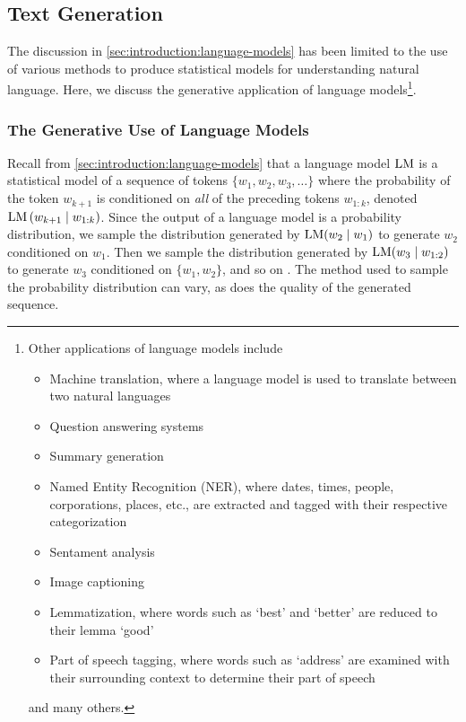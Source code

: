 \subsection{Text Generation}\label{sec:introduction:text-generation}

The discussion in \autoref{sec:introduction:language-models} has been limited to the use of various methods to produce statistical models for understanding natural language.
Here, we discuss the generative application of language models\footnote{
    Other applications of language models include
    \begin{itemize}
        \item Machine translation, where a language model is used to translate between two natural languages
        \item Question answering systems
        \item Summary generation
        \item Named Entity Recognition (NER), where dates, times, people, corporations, places, etc., are extracted and tagged with their respective categorization
        \item Sentament analysis
        \item Image captioning
        \item Lemmatization, where words such as `best' and `better' are reduced to their lemma `good'
        \item Part of speech tagging, where words such as `address' are examined with their surrounding context to determine their part of speech
    \end{itemize}
    and many others.
}.

\subsubsection{The Generative Use of Language Models}\label{sec:text-generation:language-models}

Recall from \autoref{sec:introduction:language-models} that a language model $\operatorname{LM}$ is a statistical model of a sequence of tokens $\{w_1, w_2, w_3, \dots\}$ where the probability of the token $w_{k+1}$ is conditioned on \textit{all} of the preceding tokens $w_{1:k}$, denoted $\operatorname{LM}\left(w_{k+1} \mid w_{1:k}\right)$.
Since the output of a language model is a probability distribution, we sample the distribution generated by $\operatorname{LM}(w_2 \mid w_1)$ to generate $w_2$ conditioned on $w_1$.
Then we sample the distribution generated by $\operatorname{LM}(w_3 \mid w_{1:2})$ to generate $w_3$ conditioned on $\{w_1, w_2\}$, and so on \cite{goldberg_2017}.
The method used to sample the probability distribution can vary, as does the quality of the generated sequence.

